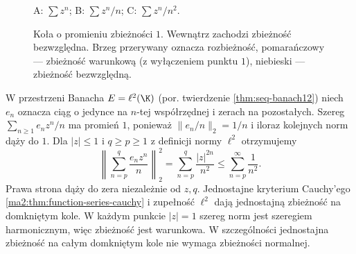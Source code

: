 \begin{figure}[htbp]
\centering
{}

\small
A: $\sum z^n$; \quad
B: $\sum z^n/n$; \quad
C: $\sum z^n/n^2$.
\caption{Koła o promieniu zbieżności $1$.
Wewnątrz zachodzi zbieżność bezwzględna.
Brzeg przerywany oznacza rozbieżność,
pomarańczowy --- zbieżność warunkową
(z wyłączeniem punktu $1$), niebieski ---
zbieżność bezwzględną.}
\label{ma2:fig:power-boundary}
\end{figure}
\FloatBarrier

\begin{przyklad}
\label{ma2:ex:power-vector-boundary}
W przestrzeni Banacha $E=\ell^2(\K)$
(por. twierdzenie \ref{thm:seq-banach12})
niech $e_n$ oznacza ciąg o jedynce na $n$-tej
współrzędnej i zerach na pozostałych.
Szereg $\sum_{n\ge1}e_n z^n/n$ ma promień
$1$, ponieważ $\|e_n/n\|_2=1/n$ i iloraz
kolejnych norm dąży do $1$.
Dla $|z|\le1$ i $q\ge p\ge1$ z definicji
normy $\ell^2$ otrzymujemy
\[
 \left\|\sum_{n=p}^q\frac{e_n z^n}{n}\right\|_2^2
 =\sum_{n=p}^q\frac{|z|^{2n}}{n^2}
 \le\sum_{n=p}^{\infty}\frac1{n^2}.
\]
Prawa strona dąży do zera niezależnie od $z,q$.
Jednostajne kryterium Cauchy'ego
\ref{ma2:thm:function-series-cauchy}
i zupełność $\ell^2$ dają jednostajną zbieżność
na domkniętym kole. W każdym punkcie
$|z|=1$ szereg norm jest szeregiem harmonicznym,
więc zbieżność jest warunkowa. W szczególności
jednostajna zbieżność na całym domkniętym kole
nie wymaga zbieżności normalnej.
\end{przyklad}

